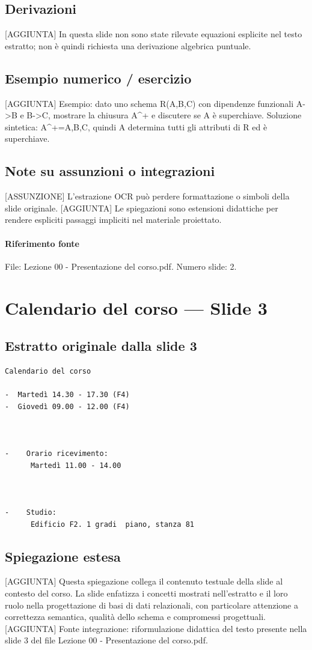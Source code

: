 \documentclass[11pt]{article}
\begin{document}
\subsection*{Derivazioni}
[AGGIUNTA] In questa slide non sono state rilevate equazioni esplicite nel testo estratto; non è quindi richiesta una derivazione algebrica puntuale.
\subsection*{Esempio numerico / esercizio}
[AGGIUNTA] Esempio: dato uno schema R(A,B,C) con dipendenze funzionali A->B e B->C, mostrare la chiusura A^+ e discutere se A è superchiave. Soluzione sintetica: A^+={A,B,C}, quindi A determina tutti gli attributi di R ed è superchiave.
\subsection*{Note su assunzioni o integrazioni}
[ASSUNZIONE] L'estrazione OCR può perdere formattazione o simboli della slide originale.
[AGGIUNTA] Le spiegazioni sono estensioni didattiche per rendere espliciti passaggi impliciti nel materiale proiettato.
\paragraph{Riferimento fonte} File: Lezione 00 - Presentazione del corso.pdf. Numero slide: 2.
\section{Calendario del corso --- Slide 3}
\subsection*{Estratto originale dalla slide 3}
\begin{lstlisting}
Calendario del corso

-  Martedì 14.30 - 17.30 (F4)
-  Giovedì 09.00 - 12.00 (F4)



-    Orario ricevimento:
      Martedì 11.00 - 14.00



-    Studio:
      Edificio F2. 1 gradi  piano, stanza 81
\end{lstlisting}
\subsection*{Spiegazione estesa}
[AGGIUNTA] Questa spiegazione collega il contenuto testuale della slide al contesto del corso. La slide enfatizza i concetti mostrati nell'estratto e il loro ruolo nella progettazione di basi di dati relazionali, con particolare attenzione a correttezza semantica, qualità dello schema e compromessi progettuali.
[AGGIUNTA] Fonte integrazione: riformulazione didattica del testo presente nella slide 3 del file Lezione 00 - Presentazione del corso.pdf.
\end{document}
